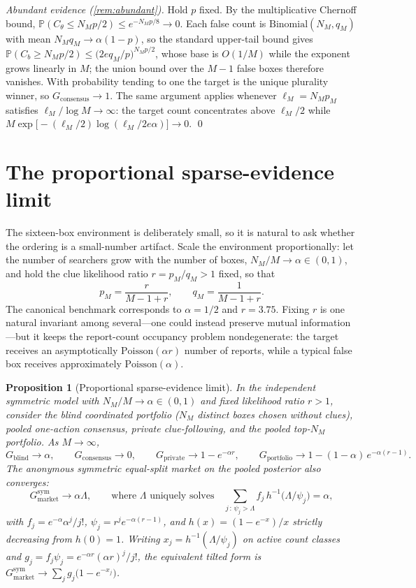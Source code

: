 \documentclass[11pt]{article}
\newtheorem{proposition}{Proposition}
\theoremstyle{definition}
\theoremstyle{remark}
\newcommand{\Prob}{\mathbb{P}}
\newcommand{\1}{\mathbf{1}}
\newcommand{\priv}{\mathrm{private}}
\newcommand{\cons}{\mathrm{consensus}}
\newcommand{\mkt}{\mathrm{market}}
\begin{document}
\emph{Abundant evidence (\cref{rem:abundant}).} Hold $p$ fixed. By the multiplicative Chernoff bound, $\Prob(C_\theta\le N_Mp/2)\le e^{-N_Mp/8}\to0$. Each false count is $\mathrm{Binomial}(N_M,q_M)$ with mean $N_Mq_M\to\alpha(1-p)$, so the standard upper-tail bound gives $\Prob(C_b\ge N_Mp/2)\le\bigl(2eq_M/p\bigr)^{N_Mp/2}$, whose base is $O(1/M)$ while the exponent grows linearly in $M$; the union bound over the $M-1$ false boxes therefore vanishes. With probability tending to one the target is the unique plurality winner, so $G_{\cons}\to1$. The same argument applies whenever $\ell_M=N_Mp_M$ satisfies $\ell_M/\log M\to\infty$: the target count concentrates above $\ell_M/2$ while $M\exp\bigl[-(\ell_M/2)\log(\ell_M/2e\alpha)\bigr]\to0$. \qed

\section{The proportional sparse-evidence limit}
\label{sec:scaling}

The sixteen-box environment is deliberately small, so it is natural to ask whether the ordering is a small-number artifact. Scale the environment proportionally: let the number of searchers grow with the number of boxes, $N_M/M\to\alpha\in(0,1)$, and hold the clue likelihood ratio $r=p_M/q_M>1$ fixed, so that
\[
p_M=\frac{r}{M-1+r},
\qquad
q_M=\frac{1}{M-1+r}.
\]
The canonical benchmark corresponds to $\alpha=1/2$ and $r=3.75$. Fixing $r$ is one natural invariant among several---one could instead preserve mutual information---but it keeps the report-count occupancy problem nondegenerate: the target receives an asymptotically $\mathrm{Poisson}(\alpha r)$ number of reports, while a typical false box receives approximately $\mathrm{Poisson}(\alpha)$.

\begin{proposition}[Proportional sparse-evidence limit]
\label{prop:scaling}
In the independent symmetric model with $N_M/M\to\alpha\in(0,1)$ and fixed likelihood ratio $r>1$, consider the blind coordinated portfolio ($N_M$ distinct boxes chosen without clues), pooled one-action consensus, private clue-following, and the pooled top-$N_M$ portfolio. As $M\to\infty$,
\[
G_{\mathrm{blind}}\longrightarrow\alpha,
\qquad
G_{\cons}\longrightarrow 0,
\qquad
G_{\priv}\longrightarrow 1-e^{-\alpha r},
\qquad
G_{\mathrm{portfolio}}\longrightarrow 1-(1-\alpha)\,e^{-\alpha(r-1)}.
\]
The anonymous symmetric equal-split market on the pooled posterior also converges:
\begin{equation}
G_{\mkt}^{\mathrm{sym}}\longrightarrow \alpha\Lambda,
\qquad
\text{where $\Lambda$ uniquely solves}
\quad
\sum_{j\,:\,\psi_j>\Lambda} f_j\,h^{-1}\!\bigl(\Lambda/\psi_j\bigr)=\alpha,
\label{eq:market-limit}
\end{equation}
with $f_j=e^{-\alpha}\alpha^{j}/j!$, $\psi_j=r^{j}e^{-\alpha(r-1)}$, and $h(x)=(1-e^{-x})/x$ strictly decreasing from $h(0)=1$. Writing $x_j=h^{-1}(\Lambda/\psi_j)$ on active count classes and $g_j=f_j\psi_j=e^{-\alpha r}(\alpha r)^{j}/j!$, the equivalent tilted form is $G_{\mkt}^{\mathrm{sym}}\to\sum_j g_j\bigl(1-e^{-x_j}\bigr)$.
\end{proposition}
\end{document}
